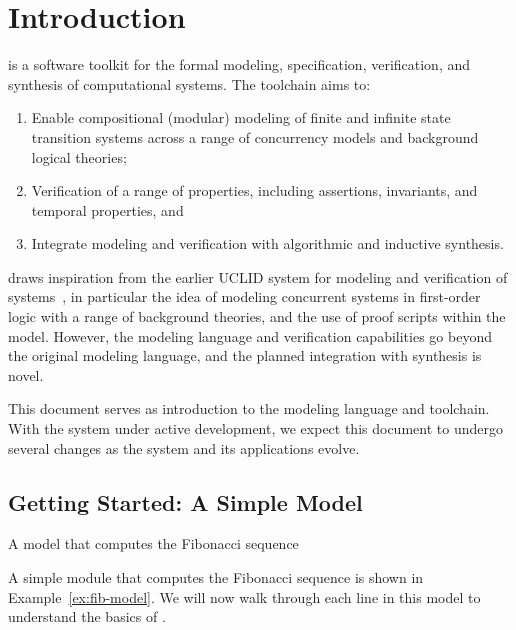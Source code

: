 \chapter{Introduction}

\uclid{} is a software toolkit for the formal modeling, specification,
verification, and synthesis of computational systems. 
The \uclid{} toolchain aims to:
\begin{enumerate}
\item Enable compositional (modular) modeling of finite and infinite state transition systems across a range of concurrency models and background logical theories;
\item Verification of a range of properties, including assertions, invariants, and temporal properties, and %
\item Integrate modeling and verification with algorithmic and inductive synthesis.
\end{enumerate}

\uclid draws inspiration from the earlier {UCLID} system for modeling
and verification of systems~\cite{bryant-cav02,DBLP:conf/cav/LahiriS04}, in particular
the idea of modeling concurrent systems in first-order logic 
with a range of background theories, and the use of proof scripts
within the model. However, the \uclid modeling
language and verification capabilities go beyond the original modeling 
language, and the planned integration with synthesis is novel.

This document serves as introduction to the \uclid{} modeling 
language and toolchain. With the \uclid system under active
development, we expect this document to undergo several changes
as the system and its applications evolve.

\section{Getting Started: A Simple \uclid{} Model}

\begin{uclidlisting}[htbp]
    
    \label{ex:fib-model}
\caption{A \uclid{} model that computes the Fibonacci sequence}
\end{uclidlisting}

A simple \uclid{} module that computes the Fibonacci sequence is shown in Example~\ref{ex:fib-model}.  We will now walk through each line in this model to understand the basics of \uclid{}.

